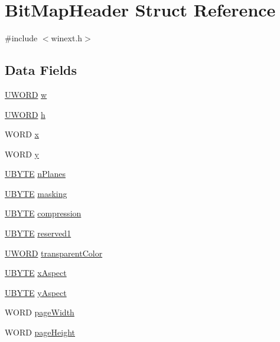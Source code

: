 \hypertarget{structBitMapHeader}{\section{Bit\+Map\+Header Struct Reference}
\label{structBitMapHeader}
}


{\ttfamily \#include $<$winext.\+h$>$}

\subsection*{Data Fields}
\begin{DoxyCompactItemize}
\item 
\hyperlink{bitmfile_8h_a0428171499a4ab7aebc2bf058ae337df}{U\+W\+O\+R\+D} \hyperlink{structBitMapHeader_addb60a981d49eed2185521b722fda07a}{w}
\item 
\hyperlink{bitmfile_8h_a0428171499a4ab7aebc2bf058ae337df}{U\+W\+O\+R\+D} \hyperlink{structBitMapHeader_a207123a0ebb6f3ac8803fb486184347d}{h}
\item 
W\+O\+R\+D \hyperlink{structBitMapHeader_a8e6de2b624a77aee2695f35f1b340645}{x}
\item 
W\+O\+R\+D \hyperlink{structBitMapHeader_a5abfd91fa563f69f77555e151292c431}{y}
\item 
\hyperlink{bitmfile_8h_aa068c7f96c3fdd66282567bcb068db80}{U\+B\+Y\+T\+E} \hyperlink{structBitMapHeader_af1b1ea355b635d40198d9d97989bc733}{n\+Planes}
\item 
\hyperlink{bitmfile_8h_aa068c7f96c3fdd66282567bcb068db80}{U\+B\+Y\+T\+E} \hyperlink{structBitMapHeader_a5178ba1e7c3d285038be1436643fc625}{masking}
\item 
\hyperlink{bitmfile_8h_aa068c7f96c3fdd66282567bcb068db80}{U\+B\+Y\+T\+E} \hyperlink{structBitMapHeader_a92825e3c952c151ee3f81630ced3e298}{compression}
\item 
\hyperlink{bitmfile_8h_aa068c7f96c3fdd66282567bcb068db80}{U\+B\+Y\+T\+E} \hyperlink{structBitMapHeader_af0d7f0f49e119ffbe3d4691c186702f2}{reserved1}
\item 
\hyperlink{bitmfile_8h_a0428171499a4ab7aebc2bf058ae337df}{U\+W\+O\+R\+D} \hyperlink{structBitMapHeader_acb7a029e55d56f59ac0bc3311dca7a1d}{transparent\+Color}
\item 
\hyperlink{bitmfile_8h_aa068c7f96c3fdd66282567bcb068db80}{U\+B\+Y\+T\+E} \hyperlink{structBitMapHeader_a6e885e5664ff89d1691333cf0c4a6327}{x\+Aspect}
\item 
\hyperlink{bitmfile_8h_aa068c7f96c3fdd66282567bcb068db80}{U\+B\+Y\+T\+E} \hyperlink{structBitMapHeader_a088a85e003b0f93b333c364c92d7b002}{y\+Aspect}
\item 
W\+O\+R\+D \hyperlink{structBitMapHeader_a0f8da84e2be2bc315960071931dcaebe}{page\+Width}
\item 
W\+O\+R\+D \hyperlink{structBitMapHeader_a8bdbcc13d038ad9ec4903cbda9787322}{page\+Height}
\end{DoxyCompactItemize}


